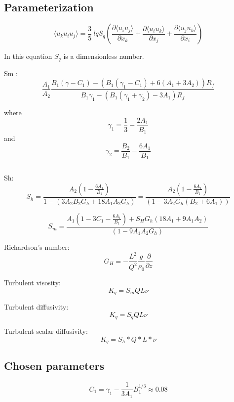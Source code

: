 \documentclass[
  letterpaper,
  DIV=11,
  numbers=noendperiod]{scrartcl}
\begin{document}
\subsection{Parameterization}

\begin{equation}
\langle u_k u_i u_j \rangle = \frac{3}{5} 
 ~l q S_q 
 \left( \frac{\partial \langle u_i u_j \rangle}{\partial x_k}  
+ \frac{\partial \langle u_i u_k \rangle}{\partial x_j}
+ \frac{\partial \langle u_j u_k \rangle}{\partial x_i} \right)
\end{equation}

In this equation \(S_q\) is a dimensionless number.

Sm : \begin{equation}
\frac{A_1}{A_2} \frac{B_1(\gamma - C_1) - (B_1 (\gamma_1 - C_1) + 6 (A_1 + 3A_2)) R_f}{B_1 \gamma_1 - (B_1(\gamma_1 + \gamma_2) - 3A_1) R_f}
\end{equation}

where \[ \gamma_1 = \frac{1}{3} - \frac{2 A_1}{B_1} \] and
\[ \gamma_2 = \frac{B_2}{B_1} - \frac{6 A_1}{B_1} \]

\[ \]

Sh:
\[ S_h  =  \frac{A_2 (1 - \frac{6 A_1}{B_1})}{1-(3 A_2 B_2 G_h + 18 A_1 A_2 G_h) }  = \frac{A_2 (1 - \frac{6 A_1}{B_1})}{(1-3 A_2 G_h (B_2+6 A_1))}   \]

\[ 
S_m = \frac{A_1 (1 - 3C_1 - \frac{6A_1}{B_1}) + S_H G_h(18A_1 + 9A_1A_2)}{(1 - 9A_1 A_2 G_h)}
 \]

Richardson's number:
\[ G_H = - \frac{L^2}{Q^2}\frac{g}{\rho_0}\frac{\partial}{\partial z}\]

Turbulent visosity: \begin{equation}
K_q = S_m  Q  L  \nu
\end{equation}

Turbulent diffusivity: \begin{equation}
K_q = S_q  Q  L  \nu 
\end{equation}

Turbulent scalar diffusivity: \begin{equation}
K_q = S_h * Q * L * \nu 
\end{equation}

\subsection{Chosen parameters}

\[ C_1 = \gamma_1 - \frac{1}{3A_1} B_1^{1/3} \approx 0.08\]
\end{document}

